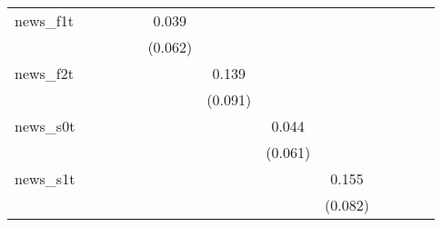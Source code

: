 {\begin{tabular}{l*{12}{c}}
\addlinespace
news\_f1t    &                     &                     &                     &                     &       0.039         &                     &                     &                     &                     &                     &                     &                     \\
            &                     &                     &                     &                     &     (0.062)         &                     &                     &                     &                     &                     &                     &                     \\
\addlinespace
news\_f2t    &                     &                     &                     &                     &                     &       0.139         &                     &                     &                     &                     &                     &                     \\
            &                     &                     &                     &                     &                     &     (0.091)         &                     &                     &                     &                     &                     &                     \\
\addlinespace
news\_s0t    &                     &                     &                     &                     &                     &                     &       0.044         &                     &                     &                     &                     &                     \\
            &                     &                     &                     &                     &                     &                     &     (0.061)         &                     &                     &                     &                     &                     \\
\addlinespace
news\_s1t    &                     &                     &                     &                     &                     &                     &                     &       0.155\sym{*}  &                     &                     &                     &                     \\
            &                     &                     &                     &                     &                     &                     &                     &     (0.082)         &                     &                     &                     &                     \\

\end{tabular}}
